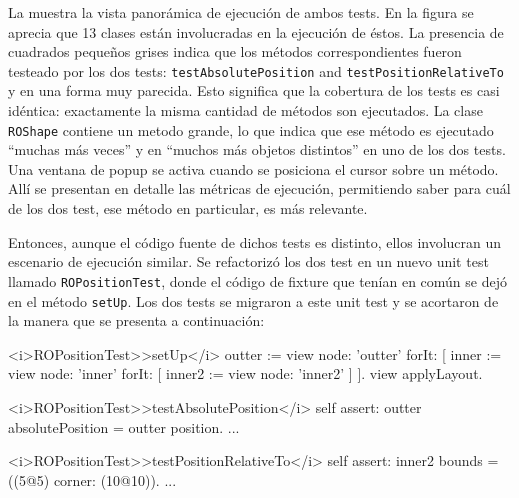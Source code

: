 
\par La  muestra la vista panorámica de ejecución de ambos tests. En la figura se aprecia que 13 clases están involucradas en la ejecución de éstos. La presencia de cuadrados pequeños grises indica que los métodos correspondientes fueron testeado por los dos tests: {\tt testAbsolutePosition} and {\tt testPositionRelativeTo} y en una forma muy parecida. Esto significa que la cobertura de los tests es casi idéntica: exactamente la misma cantidad de métodos son ejecutados. La clase {\tt ROShape} contiene un metodo grande, lo que indica que ese método es ejecutado  ``muchas más veces'' y en ``muchos más objetos distintos'' en uno de los dos tests. Una ventana de popup se activa cuando se posiciona el cursor sobre un método. Allí se presentan en detalle las métricas de ejecución, permitiendo saber para cuál de los dos test, ese método en particular, es más relevante.


\par Entonces, aunque el código fuente de dichos tests es distinto, ellos involucran un escenario de ejecución similar. Se refactorizó los dos test en un nuevo unit test llamado {\tt ROPositionTest}, donde el código de fixture que tenían en común se dejó en el método {\tt setUp}. Los dos tests se migraron a este unit test y se acortaron de la manera que se presenta a continuación:


\begin{codeWithLineNumbers}
<i>ROPositionTest>>setUp</i>
	outter := view node: 'outter' forIt: [
		inner := view node: 'inner' forIt: [
			inner2 := view node: 'inner2'
		]
	].
	view applyLayout.	
	
<i>ROPositionTest>>testAbsolutePosition</i>
	self assert: outter absolutePosition = outter position.
	...
		
<i>ROPositionTest>>testPositionRelativeTo</i>
	self assert: inner2 bounds = ((5@5) corner: (10@10)).
	...
\end{codeWithLineNumbers}

